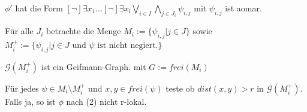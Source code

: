 \documentclass[12pt]{article}
\begin{document}
$\phi'$ hat die Form $[\neg] \exists x_1 ... [\neg] \exists x_l \bigvee_{i\in I} \bigwedge_{j \in J_i} \psi_{i,j}    $ mit $\psi_{i,j}$ ist aomar.

Für alle $J_i$ betrachte die Menge $M_i := \{\psi_{i,j}|j\in J\}$ sowie $M_i^+:= \{\psi_{i,j}|j\in J\text{ und }\psi\text{ ist nicht negiert.}\}$

$\mathcal{G}(M^+_i)$ ist ein Geifmann-Graph. mit $G:=frei(M_i)$

Für jedes $\psi \in M_i\setminus M_i^+$ und $x,y\in frei(\psi)$ teste ob $dist(x,y)>r$ in $\mathcal{G}(M^+_i)$. Falls ja, so ist $\phi$ nach (2) nicht r-lokal.



%
%
%
%
\end{document}
